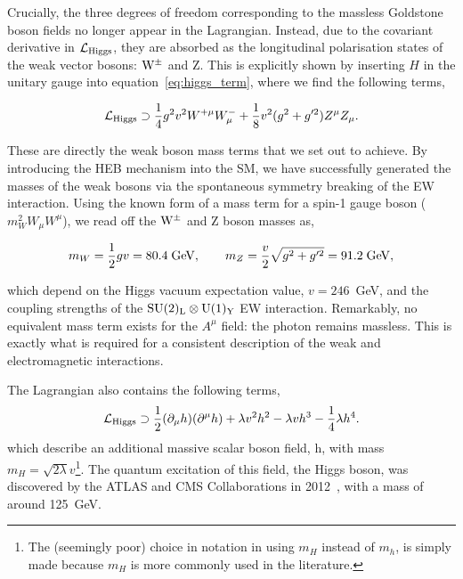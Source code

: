 \noindent
Crucially, the three degrees of freedom corresponding to the massless Goldstone boson fields no longer appear in the Lagrangian. Instead, due to the covariant derivative in $\mathcal{L}_{\rm{Higgs}}$, they are absorbed as the longitudinal polarisation states of the weak vector bosons: ${\rm{W}}^{\pm}$ and Z. This is explicitly shown by inserting $H$ in the unitary gauge into equation~\ref{eq:higgs_term}, where we find the following terms,

\begin{equation}
    \mathcal{L}_{\rm{Higgs}} \supset \frac{1}{4}g^2v^2W^{+\mu}W^-_\mu + \frac{1}{8}v^2(g^2+g'^2)Z^{\mu}Z_\mu.
\end{equation}

\noindent
These are directly the weak boson mass terms that we set out to achieve. By introducing the HEB mechanism into the SM, we have successfully generated the masses of the weak bosons via the spontaneous symmetry breaking of the EW interaction. Using the known form of a mass term for a spin-1 gauge boson ($m_W^2 W_\mu W^\mu$), we read off the ${\rm{W}}^{\pm}$ and Z boson masses as,

\begin{equation}
    m_W = \frac{1}{2}gv = 80.4\;{\rm{GeV}}, \qquad m_Z = \frac{v}{2}\sqrt{g^2+g'^2} = 91.2\;{\rm{GeV}},
\end{equation}

\noindent
which depend on the Higgs vacuum expectation value, $v=246$~GeV, and the coupling strengths of the ${\rm{SU}(2)_{\rm{L}}}\otimes{\rm{U}}(1)_{\rm{Y}}$ EW interaction. Remarkably, no equivalent mass term exists for the $A^\mu$ field: the photon remains massless. This is exactly what is required for a consistent description of the weak and electromagnetic interactions.

The Lagrangian also contains the following terms,
\begin{equation}\label{eq:scalar_lagrangian}
    \mathcal{L}_{\rm{Higgs}} \supset \frac{1}{2}(\partial_\mu h)(\partial^\mu h) + \lambda v^2 h^2 -{\lambda}vh^3 -\frac{1}{4}\lambda h^4.
\end{equation}
\noindent
which describe an additional massive scalar boson field, h, with mass $m_H=\sqrt{2\lambda}v$\footnote{The (seemingly poor) choice in notation in using $m_H$ instead of $m_h$, is simply made because $m_H$ is more commonly used in the literature.}. The quantum excitation of this field, the Higgs boson, was discovered by the ATLAS and CMS Collaborations in 2012~\cite{Aad:2012tfa,Chatrchyan:2012xdj,Chatrchyan:2013lba}, with a mass of around 125~GeV. 

